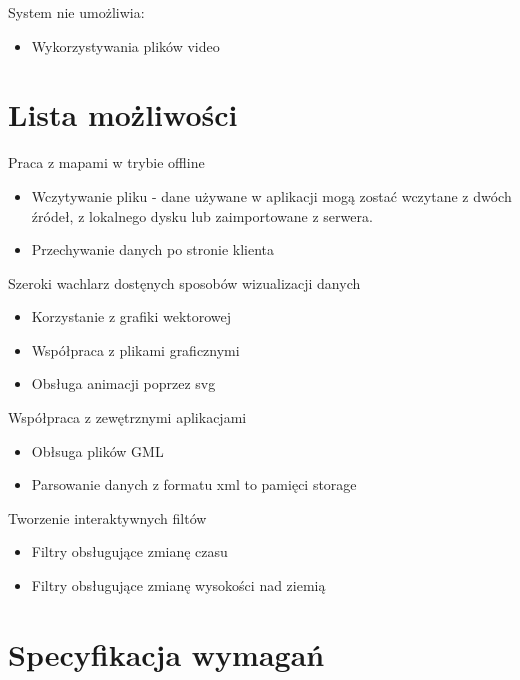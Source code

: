System nie umożliwia:
\begin{itemize}
\item
Wykorzystywania plików video

\end{itemize}


\section{Lista możliwości}
\label{sec:listamozliwosci}

Praca z mapami w trybie offline
\begin{itemize}
\item
Wczytywanie pliku - dane używane w aplikacji mogą zostać wczytane z dwóch źródeł, z lokalnego dysku lub zaimportowane z serwera.

\item
Przechywanie danych po stronie klienta

\end{itemize}

Szeroki wachlarz dostęnych sposobów wizualizacji danych
\begin{itemize}
\item
Korzystanie z grafiki wektorowej

\item
Współpraca z plikami graficznymi

\item
Obsługa animacji poprzez svg

\end{itemize}

Współpraca z zewętrznymi aplikacjami
\begin{itemize}
\item
Obłsuga plików GML

\item
Parsowanie danych z formatu xml to pamięci storage

\end{itemize}

Tworzenie interaktywnych filtów
\begin{itemize}
\item
Filtry obsługujące zmianę czasu

\item
Filtry obsługujące zmianę wysokości nad ziemią

\end{itemize}




\section{Specyfikacja wymagań}
\label{sec:specyfikacja wymagan}

